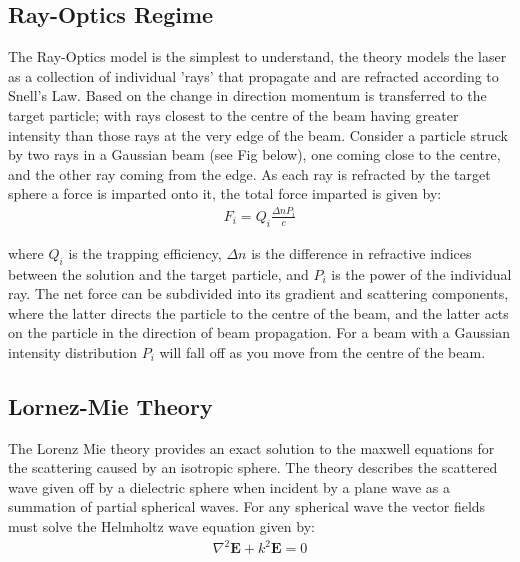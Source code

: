 \subsection{Ray-Optics Regime}

The Ray-Optics model is the simplest to understand, the theory models 
the laser as a collection of individual 'rays' that propagate and are 
refracted according to Snell's Law. Based on the change in direction 
momentum is transferred to the target particle; with rays closest to 
the centre of the beam having greater intensity than those rays at 
the very edge of the beam. Consider a particle struck by two rays in 
a Gaussian beam (see Fig below), one coming close to the centre, and 
the other ray coming from the edge. As each ray is refracted by the 
target sphere a force is imparted onto it, the total force imparted 
is given by:
\begin{align}
	F_i = Q_i\frac{\Delta n P_i}{c}
\end{align}

where $Q_i$ is the trapping efficiency, $\Delta n$ is the difference
in refractive indices between the solution and the target particle,
and $P_i$ is the power of the individual ray. The net force can be 
subdivided into its gradient and scattering components, where the latter
directs the particle to the centre of the beam, and the latter acts on 
the particle in the direction of beam propagation. For a beam with a
Gaussian intensity distribution $P_i$ will fall off as you move from
the centre of the beam.  


\subsection{Lornez-Mie Theory}

The Lorenz Mie theory provides an exact solution to the maxwell equations 
for the scattering caused by an isotropic sphere. The theory describes the 
scattered wave given off by a dielectric sphere when incident by a plane 
wave as a summation of partial spherical waves. For any spherical wave the 
vector fields must solve the Helmholtz wave equation given by:
\begin{align}
	\nabla^2\mathbf{E} +k^2\mathbf{E} = 0
\end{align} 

